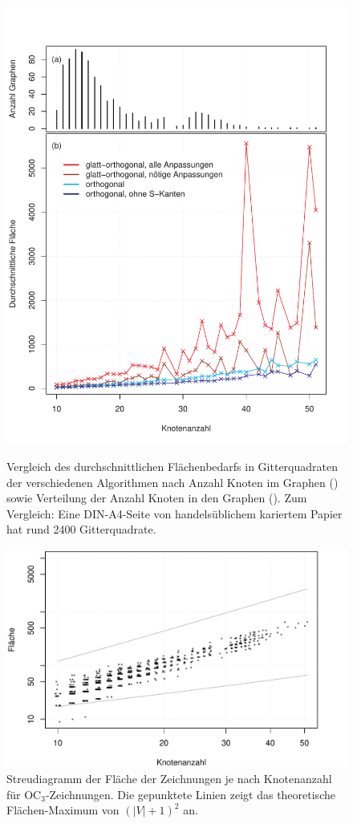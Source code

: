\documentclass[a4paper]{scrreprt}
\theoremstyle{definition}
\begin{document}
\begin{figure}[h]
  \centering
  {\includegraphics[width=\textwidth]{plots/area_comparison} \label{fig:graphSizes} \label{fig:areaComparison}}
  \caption{Vergleich des durchschnittlichen Flächenbedarfs in Gitterquadraten der verschiedenen Algorithmen nach Anzahl Knoten im Graphen () sowie  Verteilung der Anzahl Knoten in den Graphen (). Zum Vergleich: Eine DIN-A4-Seite von handelsüblichem kariertem Papier hat rund 2400 Gitterquadrate.}
  \label{fig:areaComparisonAndGraphSizes}
\end{figure}
\begin{figure}[h]
  \centering
  \includegraphics[width=.9\textwidth]{plots/area_orthogonal}
  \caption{Streudiagramm der Fläche der Zeichnungen je nach Knotenanzahl für OC$_3$-Zeichnungen. Die gepunktete Linien zeigt das theoretische Flächen-Maximum von $(|V|+1)^2$ an.}
  \label{fig:ortho-noCompress}
\end{figure}
\end{document}
